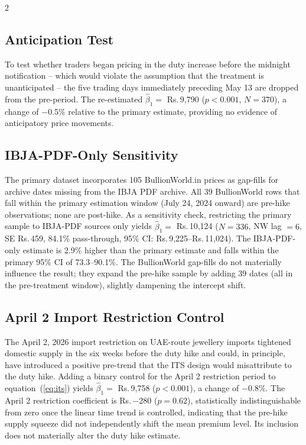 \documentclass[12pt]{article}
\begin{document}
\begin{multicols}{2}
\subsection*{Anticipation Test}

To test whether traders began pricing in the duty increase before the midnight notification -- which would violate the assumption that the treatment is unanticipated -- the five trading days immediately preceding May 13 are dropped from the pre-period. The re-estimated $\hat{\beta}_1 = $ Rs.\,9,790 ($p < 0.001$, $N = 370$), a change of $-$0.5\% relative to the primary estimate, providing no evidence of anticipatory price movements.

\subsection*{IBJA-PDF-Only Sensitivity}

The primary dataset incorporates 105 BullionWorld.in prices as gap-fills for archive dates missing from the IBJA PDF archive. All 39 BullionWorld rows that fall within the primary estimation window (July 24, 2024 onward) are pre-hike observations; none are post-hike. As a sensitivity check, restricting the primary sample to IBJA-PDF sources only yields $\hat{\beta}_1 = $ Rs.\,10,124 ($N = 336$, NW lag $= 6$, SE Rs.\,459, 84.1\% pass-through, 95\% CI: Rs.\,9,225--Rs.\,11,024). The IBJA-PDF-only estimate is 2.9\% higher than the primary estimate and falls within the primary 95\% CI of 73.3--90.1\%. The BullionWorld gap-fills do not materially influence the result; they expand the pre-hike sample by adding 39 dates (all in the pre-treatment window), slightly dampening the intercept shift.

\subsection*{April 2 Import Restriction Control}

The April 2, 2026 import restriction on UAE-route jewellery imports tightened domestic supply in the six weeks before the duty hike and could, in principle, have introduced a positive pre-trend that the ITS design would misattribute to the duty hike. Adding a binary control for the April 2 restriction period to equation~(\ref{eq:its}) yields $\hat{\beta}_1 = $ Rs.\,9,758 ($p < 0.001$), a change of $-$0.8\%. The April 2 restriction coefficient is Rs.\,$-$280 ($p = 0.62$), statistically indistinguishable from zero once the linear time trend is controlled, indicating that the pre-hike supply squeeze did not independently shift the mean premium level. Its inclusion does not materially alter the duty hike estimate.


\end{multicols}
\end{document}
